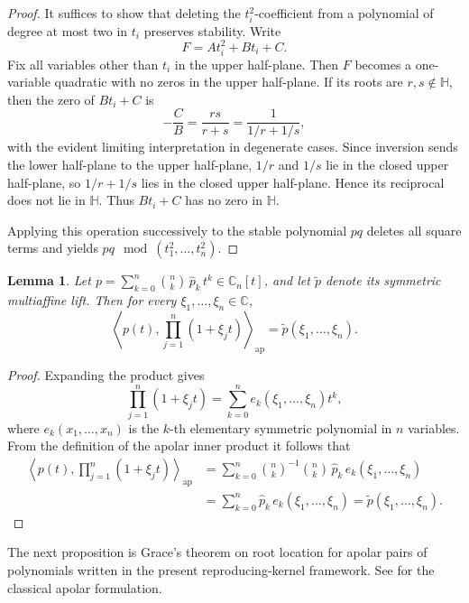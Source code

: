 \documentclass[11pt]{amsart}
\newtheorem{lem}[thm]{Lemma}
\theoremstyle{definition}
\newcommand{\bn}[2]{{\textstyle\binom{#1}{#2}}}
\begin{document}
\begin{proof}
It suffices to show that deleting the $t_i^2$-coefficient from
a polynomial of degree at most two in $t_i$ preserves stability.
Write
\[
  F=A t_i^2+B t_i+C.
\]
Fix all variables other than $t_i$ in the upper half-plane. Then
$F$ becomes a one-variable quadratic with no zeros in the upper
half-plane. If its roots are $r,s\notin\mathbb H$, then the zero
of $B t_i+C$ is
\[
  -\frac{C}{B}=\frac{rs}{r+s}
  =\frac{1}{1/r+1/s},
\]
with the evident limiting interpretation in degenerate cases.
Since inversion sends the lower half-plane to the upper half-plane,
$1/r$ and $1/s$ lie in the closed upper half-plane, so
$1/r+1/s$ lies in the closed upper half-plane. Hence its reciprocal
does not lie in $\mathbb H$. Thus $B t_i+C$ has no zero in
$\mathbb H$.

Applying this operation successively to the stable polynomial
$pq$ deletes all square terms and yields
$pq \mod (t_1^2,\dots,t_n^2)$.
\end{proof}

\begin{lem}\label{lem:lift-apolar}
Let $p = \sum_{k=0}^n \bn{n}{k}\, \hat p_k\,t^k\in \mathbb C_n[t]$, and let $\widetilde p$ denote its symmetric multiaffine lift.
Then for every $\xi_1,\ldots,\xi_n\in \mathbb C$,
\[
\left\langle p(t),\prod_{j=1}^n(1+\xi_j t)\right\rangle_{\mathrm{ap}}
=
\widetilde p(\xi_1,\ldots,\xi_n).
\]
\end{lem}

\begin{proof}
Expanding the product gives
\[
    \prod_{j=1}^n(1+\xi_j t) =
    \sum_{k=0}^n e_k(\xi_1,\ldots,\xi_n)t^k,
\]
where $e_k(x_1,\dotsc,x_n)$ is the $k$-th elementary symmetric polynomial in $n$ variables.
From the definition of the apolar inner product it follows that
\[
\begin{aligned}
\left\langle p(t),\prod_{j=1}^n(1+\xi_j t)\right\rangle_{\mathrm{ap}}
&=
\sum_{k=0}^n
\bn{n}{k}^{-1}\bn{n}{k}\,\widehat p_k\, e_k(\xi_1,\ldots,\xi_n)
  \\
&=
\sum_{k=0}^n \widehat p_k\, e_k(\xi_1,\ldots,\xi_n) =
\widetilde p(\xi_1,\ldots,\xi_n).
\end{aligned}
\]
\end{proof}

The next proposition is Grace's theorem on root location for apolar pairs of polynomials written in the present reproducing-kernel framework. See \cite[Chapter IV, Section 15]{Marden} for the classical apolar formulation.
\end{document}
